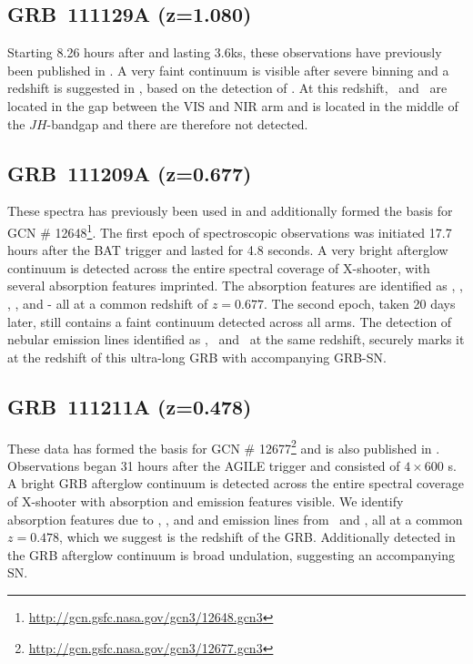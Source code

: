 \documentclass{aa}    %
\begin{document}
\subsection{GRB~111129A (z=1.080)}

Starting 8.26 hours after and lasting 3.6ks, these observations have previously
been published in \citet{Kruhler2015}. A very faint continuum is visible after
severe binning and a redshift is suggested in \citet{Kruhler2015}, based on the
detection of \oii. At this redshift, \hb~and \oii~are located in the gap between
the VIS and NIR arm and \ha is located in the middle of the $JH$-bandgap and
there are therefore not detected.

\subsection{GRB~111209A (z=0.677)}

These spectra has previously been used in \citet{Levan2013, Greiner2015,
	Kruhler2015, Kann2017} and additionally formed the basis for GCN \#
12648\footnote{\url{http://gcn.gsfc.nasa.gov/gcn3/12648.gcn3}}. The first epoch
of spectroscopic observations was initiated 17.7 hours after the BAT trigger and
lasted for 4.8 seconds. A very bright afterglow continuum is detected across the
entire spectral coverage of X-shooter, with several absorption features
imprinted. The absorption features are identified as \feii, \mgii, \mgi, \cah,
and \cak - all at a common redshift of $z = 0.677$. The second epoch, taken 20
days later, still contains a faint continuum detected across all arms. The
detection of nebular emission lines identified as \oii, \oii~and \ha~at the same
redshift, securely marks it at the redshift of this ultra-long GRB with
accompanying GRB-SN.

\subsection{GRB~111211A (z=0.478)}

These data has formed the basis for GCN \#
12677\footnote{\url{http://gcn.gsfc.nasa.gov/gcn3/12677.gcn3}} and is also published in \cite{Kruhler2015}. Observations began 31 hours after the AGILE trigger
and consisted of $4 \times 600$ s. A bright GRB afterglow continuum is detected
across the entire spectral coverage of X-shooter with absorption and emission
features visible. We identify absorption features due to \feii, \mgii, and \caii
and emission lines from \oiii~and \ha, all at a common $z = 0.478$, which we
suggest is the redshift of the GRB. Additionally detected in the GRB afterglow
continuum is broad undulation, suggesting an accompanying SN.
\end{document}
